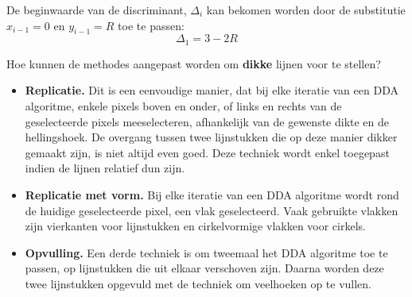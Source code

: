 \documentclass{report}
\begin{document}
\begin{enumerate}
{\begin{itemize}
			      De beginwaarde van de discriminant, $\Delta_i$ kan bekomen worden door de substitutie $x_{i - 1} = 0$ en $y_{i - 1} = R$ toe te passen:
			      $$\Delta_1 = 3 - 2R$$
			      				
		\end{itemize}
		
	}
	
			
	\vraag
	{
		Hoe kunnen de methodes aangepast worden om \textbf{dikke} lijnen voor te stellen? 
	}
	{
		\begin{itemize}
			\item \textbf{Replicatie.} Dit is een eenvoudige manier, dat bij elke iteratie van een DDA algoritme, enkele pixels boven en onder, of links en rechts van de geselecteerde pixels meeselecteren, afhankelijk van de gewenste dikte en de hellingshoek. De overgang tussen twee lijnstukken die op deze manier dikker gemaakt zijn, is niet altijd even goed. Deze techniek wordt enkel toegepast indien de lijnen relatief dun zijn.
			\item \textbf{Replicatie met vorm.} Bij elke iteratie van een DDA algoritme wordt rond de huidige geselecteerde pixel, een vlak geselecteerd. Vaak gebruikte vlakken zijn vierkanten voor lijnstukken en cirkelvormige vlakken voor cirkels.
			      				
			\item \textbf{Opvulling.} Een derde techniek is om tweemaal het DDA algoritme toe te passen, op lijnstukken die uit elkaar verschoven zijn. Daarna worden deze twee lijnstukken opgevuld met de techniek om veelhoeken op te vullen.
		\end{itemize}
	}
\end{enumerate}
\end{document}
